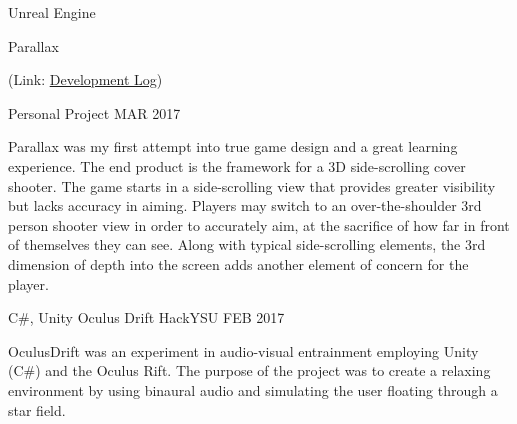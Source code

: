
\begin{cventries}
	\cventry
	{{\color{awesome} Unreal Engine}} %
	{Parallax \begin{footnotesize}{(Link: \href{https://www.youtube.com/playlist?list=PLJCbmN5AjE1XUlgY5KwFnwDh3gmhvtiSC}{\color{blue}\underline{Development Log}})}\end{footnotesize}} %
	{Personal Project} %
	{MAR 2017} %
	{
		\begin{cvitems} %
			\item {Parallax was my first attempt into true game design and a great learning experience. The end product is the framework for a 3D side-scrolling cover shooter. The game starts in a side-scrolling view that provides greater visibility but lacks accuracy in aiming. Players may switch to an over-the-shoulder 3rd person shooter view in order to accurately aim, at the sacrifice of how far in front of themselves they can see. Along with typical side-scrolling elements, the 3rd dimension of depth into the screen adds another element of concern for the player.}
		\end{cvitems}
	}
	\cventry
	{{\color{awesome} C\#, Unity}} %
	{Oculus Drift} %
	{HackYSU} %
	{FEB 2017} %
	{
		\begin{cvitems} %
			\item {OculusDrift was an experiment in audio-visual entrainment employing Unity (C\#) and the Oculus 
				Rift. The purpose of the project was to create a relaxing environment by using binaural audio and
				simulating the user floating through a star field.}
		\end{cvitems}
	}
			
\end{cventries}
